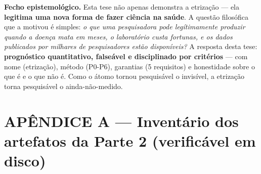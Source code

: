 \documentclass[
  12pt,
]{report}
\begin{document}
\textbf{Fecho epistemológico.} Esta tese não apenas demonstra a
etrização --- ela \textbf{legitima uma nova forma de fazer ciência na
saúde}. A questão filosófica que a motivou é simples: \emph{o que uma
pesquisadora pode legítimamente produzir quando a doença mata em meses,
o laboratório custa fortunas, e os dados publicados por milhares de
pesquisadores estão disponíveis?} A resposta desta tese:
\textbf{prognóstico quantitativo, falseável e disciplinado por
critérios} --- com nome (etrização), método (P0-P6), garantias (5
requisitos) e honestidade sobre o que é e o que não é. Como o átomo
tornou pesquisável o invisível, a etrização torna pesquisável o
ainda-não-medido.

\hypertarget{apuxeandice-a-inventuxe1rio-dos-artefatos-da-parte-2-verificuxe1vel-em-disco}{%
\chapter{APÊNDICE A --- Inventário dos artefatos da Parte 2 (verificável
em
disco)}\label{apuxeandice-a-inventuxe1rio-dos-artefatos-da-parte-2-verificuxe1vel-em-disco}}
\end{document}

